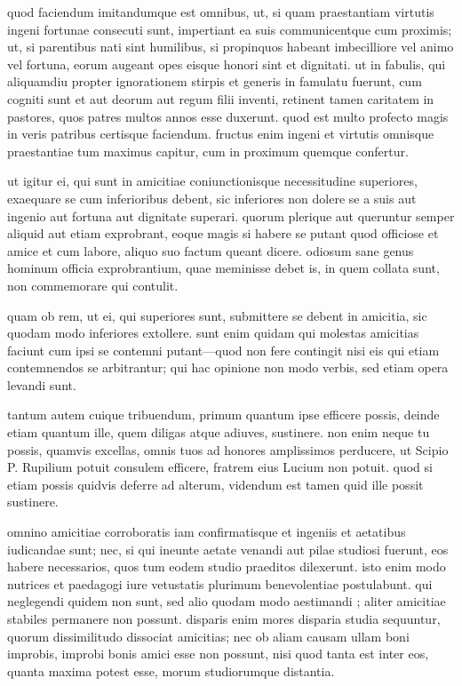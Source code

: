  quod faciendum imitandumque est omnibus, ut, si quam praestantiam virtutis ingeni fortunae consecuti sunt, impertiant ea suis communicentque cum proximis; ut, si parentibus nati sint humilibus, si propinquos habeant imbecilliore vel animo vel fortuna, eorum augeant opes eisque honori sint et dignitati. ut in fabulis, qui aliquamdiu propter ignorationem stirpis et generis in famulatu fuerunt, cum cogniti sunt et aut deorum aut regum filii inventi, retinent tamen caritatem in pastores, quos patres multos annos esse duxerunt. quod est multo profecto magis in veris patribus certisque faciendum. fructus enim ingeni et virtutis omnisque praestantiae tum maximus capitur, cum in proximum quemque confertur.

 ut igitur ei, qui sunt in amicitiae coniunctionisque necessitudine superiores, exaequare se cum inferioribus debent, sic inferiores non dolere se a suis aut ingenio aut fortuna aut dignitate superari. quorum plerique aut queruntur semper aliquid aut etiam exprobrant, eoque magis si habere se putant quod officiose et amice et cum labore, aliquo suo factum queant dicere. odiosum sane genus hominum officia exprobrantium, quae meminisse debet is, in quem collata sunt, non commemorare qui contulit.

 quam ob rem, ut ei, qui superiores sunt, submittere se debent in amicitia, sic quodam modo inferiores extollere. sunt enim quidam qui molestas amicitias faciunt cum ipsi se contemni putant—quod non fere contingit nisi eis qui etiam contemnendos se arbitrantur; qui hac opinione non modo verbis, sed etiam opera levandi sunt.

 tantum autem cuique tribuendum, primum quantum ipse efficere possis, deinde etiam quantum ille, quem diligas atque adiuves, sustinere. non enim neque tu possis, quamvis excellas, omnis tuos ad honores amplissimos perducere, ut Scipio P. Rupilium potuit consulem efficere, fratrem eius Lucium non potuit. quod si etiam possis quidvis deferre ad alterum, videndum est tamen quid ille possit sustinere.

 omnino amicitiae corroboratis iam confirmatisque et ingeniis et aetatibus iudicandae sunt; nec, si qui ineunte aetate venandi aut pilae studiosi fuerunt, eos habere necessarios, quos tum eodem studio praeditos dilexerunt. isto enim modo nutrices et paedagogi iure vetustatis plurimum benevolentiae postulabunt. qui neglegendi quidem non sunt, sed alio quodam modo aestimandi ; aliter amicitiae stabiles permanere non possunt. disparis enim mores disparia studia sequuntur, quorum dissimilitudo dissociat amicitias; nec ob aliam causam ullam boni improbis, improbi bonis amici esse non possunt, nisi quod tanta est inter eos, quanta maxima potest esse, morum studiorumque distantia.

